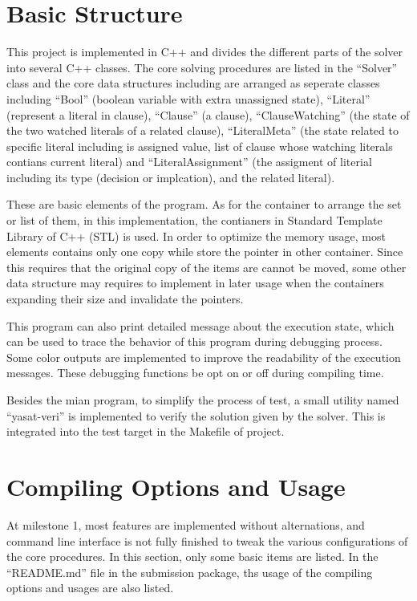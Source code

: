 \documentclass[a4paper, 11.5pt]{article}
\begin{document}
\begin{multicols}{2}
  \section{Basic Structure}
    This project is implemented in C++ and divides the different parts of the 
    solver into several C++ classes. The core solving procedures are listed in 
    the ``Solver'' class and the core data structures including are arranged as
    seperate classes including ``Bool'' (boolean variable with extra unassigned 
    state), ``Literal'' (represent a literal in clause), ``Clause'' (a clause), 
    ``ClauseWatching'' (the state of the two watched literals of a related clause),
    ``LiteralMeta'' (the state related to specific literal including is assigned value,
    list of clause whose watching literals contians current literal) and
    ``LiteralAssignment'' (the assigment of literial including its type (decision or 
    implcation), and the related literal). 

    These are basic elements of the program. As for the container to arrange the set 
    or list of them, in this implementation, the contianers in Standard Template Library 
    of C++ (STL) is used. In order to optimize the memory usage, most elements contains only 
    one copy while store the pointer in other container. Since this requires that the original 
    copy of the items are cannot be moved, some other data structure may requires to implement in later usage when the containers expanding their size and invalidate the pointers.

    This program can also print detailed message about the execution state, which can be used to 
    trace the behavior of this program during debugging process. Some color outputs are implemented to improve the readability of the execution messages. These debugging functions be opt on or off during compiling time.

    Besides the mian program, to simplify the process of test, a small utility named ``yasat-veri'' is implemented to verify the solution given by the solver. This is integrated into the test target in the Makefile of project.

  \section{Compiling Options and Usage}

    At milestone 1, most features are implemented without alternations, and 
    command line interface is not fully finished to tweak the various 
    configurations of the core procedures. In this section, only some basic 
    items are listed. In the ``README.md'' file in the submission package, ths usage of the
    compiling options and usages are also listed.


\end{multicols}
\end{document}
